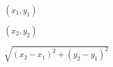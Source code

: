 \documentclass{article}
\begin{document}
$(x_1,y_1)$
\pagebreak

$(x_2,y_2)$
\pagebreak

$\sqrt{(x_2-x_1)^2+(y_2-y_1)^2}$
\pagebreak
\end{document}
